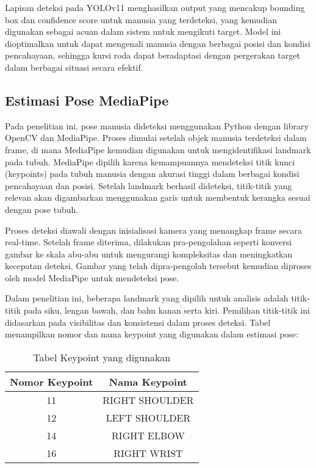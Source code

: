 Lapisan deteksi pada YOLOv11 menghasilkan output yang mencakup bounding box dan confidence score untuk manusia yang terdeteksi, yang kemudian digunakan sebagai acuan dalam sistem untuk mengikuti target. Model ini dioptimalkan untuk dapat mengenali manusia dengan berbagai posisi dan kondisi pencahayaan, sehingga kursi roda dapat beradaptasi dengan pergerakan target dalam berbagai situasi secara efektif.

\subsection{Estimasi Pose MediaPipe}
\label{subsec:estimasi_pose_mediapipe}

Pada penelitian ini, pose manusia dideteksi menggunakan Python dengan library OpenCV dan MediaPipe. Proses dimulai setelah objek manusia terdeteksi dalam frame, di mana MediaPipe kemudian digunakan untuk mengidentifikasi landmark pada tubuh. MediaPipe dipilih karena kemampuannya mendeteksi titik kunci (keypoints) pada tubuh manusia dengan akurasi tinggi dalam berbagai kondisi pencahayaan dan posisi. Setelah landmark berhasil dideteksi, titik-titik yang relevan akan digambarkan menggunakan garis untuk membentuk kerangka sesuai dengan pose tubuh.

Proses deteksi diawali dengan inisialisasi kamera yang menangkap frame secara real-time. Setelah frame diterima, dilakukan pra-pengolahan seperti konversi gambar ke skala abu-abu untuk mengurangi kompleksitas dan meningkatkan kecepatan deteksi. Gambar yang telah dipra-pengolah tersebut kemudian diproses oleh model MediaPipe untuk mendeteksi pose.

Dalam penelitian ini, beberapa landmark yang dipilih untuk analisis adalah titik-titik pada siku, lengan bawah, dan bahu kanan serta kiri. Pemilihan titik-titik ini didasarkan pada visibilitas dan konsistensi dalam proses deteksi. Tabel menampilkan nomor dan nama keypoint yang digunakan dalam estimasi pose:

\begin{table}[H]
  \centering
  \caption{Tabel Keypoint yang digunakan}
  \label{tab:keypoints}
  \begin{tabular}{|c|c|}
    \hline
    Nomor Keypoint & Nama Keypoint \\
    \hline
    11 & RIGHT SHOULDER \\
    12 & LEFT SHOULDER \\
    14 & RIGHT ELBOW \\
    16 & RIGHT WRIST \\
    \hline
  \end{tabular}
\end{table}


